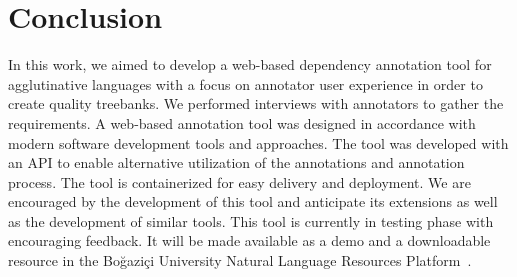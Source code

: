 \section{Conclusion}
\label{sec:conclusion}

In this work, we aimed to develop a web-based dependency annotation tool for agglutinative languages with a focus on annotator user experience in order to create quality treebanks.
We performed interviews with annotators to gather the requirements.
A web-based annotation tool was designed in accordance with modern software development tools and approaches.
The tool was developed with an API to enable alternative utilization of the annotations and annotation process.
The tool is containerized for easy delivery and deployment.
We are encouraged by the development of this tool and anticipate its extensions as well as the development of similar tools.
This tool is currently in testing phase with encouraging feedback.
It will be made available as a demo and a downloadable resource in the Boğaziçi University Natural Language Resources Platform~\cite{DIP}.
